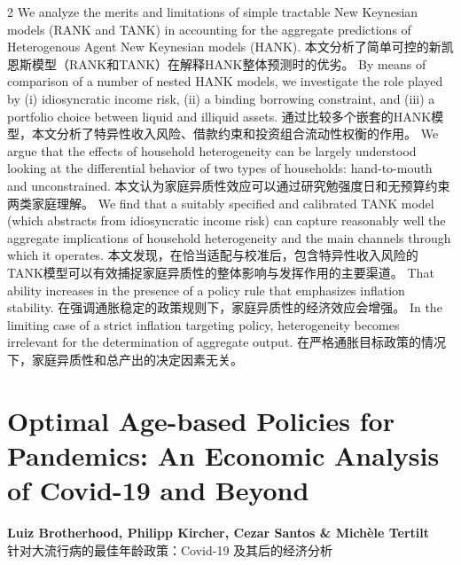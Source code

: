 \documentclass[cn,hazy,blue,14pt,screen]{elegantnote}
\begin{document}
\begin{paracol}{2}
	We analyze the merits and limitations of simple tractable New Keynesian models (RANK and TANK) in accounting for the aggregate predictions of Heterogenous Agent New Keynesian models (HANK). 
	\switchcolumn
	本文分析了简单可控的新凯恩斯模型（RANK和TANK）在解释HANK整体预测时的优劣。
	\switchcolumn*
	By means of comparison of a number of nested HANK models, we investigate the role played by (i) idiosyncratic income risk, (ii) a binding borrowing constraint, and (iii) a portfolio choice between liquid and illiquid assets. 
	\switchcolumn
	通过比较多个嵌套的HANK模型，本文分析了特异性收入风险、借款约束和投资组合流动性权衡的作用。
	\switchcolumn*
	We argue that the effects of household heterogeneity can be largely understood looking at the differential behavior of two types of households: hand-to-mouth and unconstrained. 
	\switchcolumn
	本文认为家庭异质性效应可以通过研究勉强度日和无预算约束两类家庭理解。
	\switchcolumn*
	We find that a suitably specified and calibrated TANK model (which abstracts from idiosyncratic income risk) can capture reasonably well the aggregate implications of household heterogeneity and the main channels through which it operates. 
	\switchcolumn
	本文发现，在恰当适配与校准后，包含特异性收入风险的TANK模型可以有效捕捉家庭异质性的整体影响与发挥作用的主要渠道。
	\switchcolumn*
	That ability increases in the presence of a policy rule that emphasizes inflation stability. 
	\switchcolumn
	在强调通胀稳定的政策规则下，家庭异质性的经济效应会增强。
	\switchcolumn*
	In the limiting case of a strict inflation targeting policy, heterogeneity becomes irrelevant for the determination of aggregate output.
	在严格通胀目标政策的情况下，家庭异质性和总产出的决定因素无关。

\end{paracol}

\section{Optimal Age-based Policies for Pandemics: An Economic Analysis of Covid-19 and Beyond}
\begin{center}
	\textbf{Luiz Brotherhood, Philipp Kircher, Cezar Santos \& Michèle Tertilt}\\
	针对大流行病的最佳年龄政策：Covid-19 及其后的经济分析
\end{center}
\end{document}
